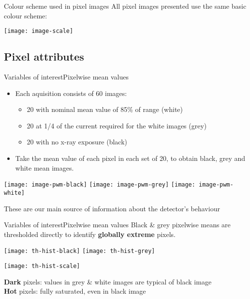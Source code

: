 \documentclass[8pt]{beamer}
\begin{document}

\begin{frame}{Colour scheme used in pixel images}
	All pixel images presented use the same basic colour scheme:
	
	\begin{center}
	\texttt{[image: image-scale]}
	\end{center}

\end{frame}


\subsection{Pixel attributes}

\begin{frame}{Variables of interest}{Pixelwise mean values}
	\begin{itemize}
		\item Each aquisition consists of 60 images:
		\begin{itemize}
			\item 20 with nominal mean value of 85\% of range (white)
			\item 20 at 1/4 of the current required for the white images (grey)
			\item 20 with no x-ray exposure (black)
		\end{itemize}
		\item Take the mean value of each pixel in each set of 20, to obtain black, grey and white mean images. 
	\end{itemize}
	
	\begin{center}
		\texttt{[image: image-pwm-black]}
		\texttt{[image: image-pwm-grey]}
		\texttt{[image: image-pwm-white]}
	\end{center}
	These are our main source of information about the detector's behaviour
\end{frame}


\begin{frame}{Variables of interest}{Pixelwise mean values}
	Black \& grey pixelwise means are thresholded directly to identify \textbf{globally extreme} pixels.
	\vspace{-12pt}
	\begin{center}
		\texttt{[image: th-hist-black]}
		\texttt{[image: th-hist-grey]}
		
		\texttt{[image: th-hist-scale]}
	\end{center}
	
	\textbf{Dark} pixels: values in grey \& white images are typical of black image\\
	\textbf{Hot} pixels: fully saturated, even in black image

\end{frame}
	
\end{document}

